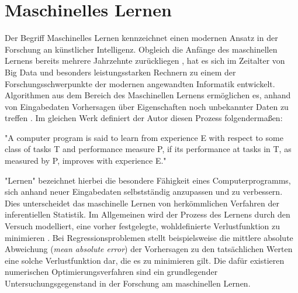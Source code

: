 \section{Maschinelles Lernen}
Der Begriff Maschinelles Lernen kennzeichnet einen modernen Ansatz in der Forschung an künstlicher Intelligenz. Obgleich die Anfänge des maschinellen Lernens bereits mehrere Jahrzehnte zurückliegen \citep{samuelStudiesMachineLearning1959, nilsson1965learning}, hat es sich im Zeitalter von Big Data und besonders leistungsstarken Rechnern zu einem der Forschungsschwerpunkte der modernen angewandten Informatik entwickelt. Algorithmen aus dem Bereich des Maschinellen Lernens ermöglichen es, anhand von Eingabedaten Vorhersagen über Eigenschaften noch unbekannter Daten zu treffen \citep{mitchellMachineLearning1997}. Im gleichen Werk definiert der Autor diesen Prozess folgendermaßen:

\begin{itquote}
    {\foreignlanguage{english}{"A computer program is said to learn from experience E with respect to some class of tasks T and performance measure P, if its performance at tasks in T, as measured by P, improves with experience E."}}
\end{itquote}

"Lernen" bezeichnet hierbei die besondere Fähigkeit eines Computerprogramms, sich anhand neuer Eingabedaten selbstständig anzupassen und zu verbessern. Dies unterscheidet das maschinelle Lernen von herkömmlichen Verfahren der inferentiellen Statistik. Im Allgemeinen wird der Prozess des Lernens durch den Versuch modelliert, eine vorher festgelegte, wohldefinierte Verlustfunktion zu minimieren . Bei Regressionsproblemen stellt beispielsweise die mittlere absolute Abweichung (\textit{mean absolute error}) der Vorhersagen zu den tatsächlichen Werten eine solche Verlustfunktion dar, die es zu minimieren gilt.
Die dafür existieren numerischen Optimierungsverfahren sind ein grundlegender Untersuchungsgegenstand in der Forschung am maschinellen Lernen. 


